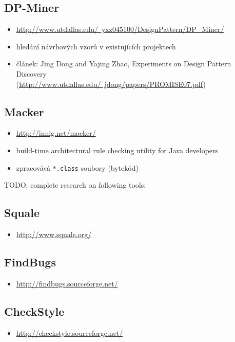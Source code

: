 \subsection{DP-Miner}
\begin{itemize}
\item \href{http://www.utdallas.edu/~yxz045100/DesignPattern/DP\_Miner/}{http://www.utdallas.edu/~yxz045100/DesignPattern/DP\_Miner/}
\item hledání návrhových vzorů v existujících projektech
\item článek: Jing Dong and Yajing Zhao, Experiments on Design Pattern Discovery \\ (\href{http://www.utdallas.edu/~jdong/papers/PROMISE07.pdf}{http://www.utdallas.edu/~jdong/papers/PROMISE07.pdf})
\end{itemize}

\subsection{Macker}
\begin{itemize}
\item \href{http://innig.net/macker/}{http://innig.net/macker/}
\item build-time architectural rule checking utility for Java developers
\item zpracovává \verb+*.class+ soubory (bytekód)
\end{itemize}

TODO: complete research on following tools:

\subsection{Squale}
\begin{itemize}
\item \href{http://www.squale.org/}{http://www.squale.org/}
\end{itemize}

\subsection{FindBugs}
\begin{itemize}
\item \href{http://findbugs.sourceforge.net/}{http://findbugs.sourceforge.net/}
\end{itemize}

\subsection{CheckStyle}
\begin{itemize}
\item \href{http://checkstyle.sourceforge.net/}{http://checkstyle.sourceforge.net/}
\end{itemize}


